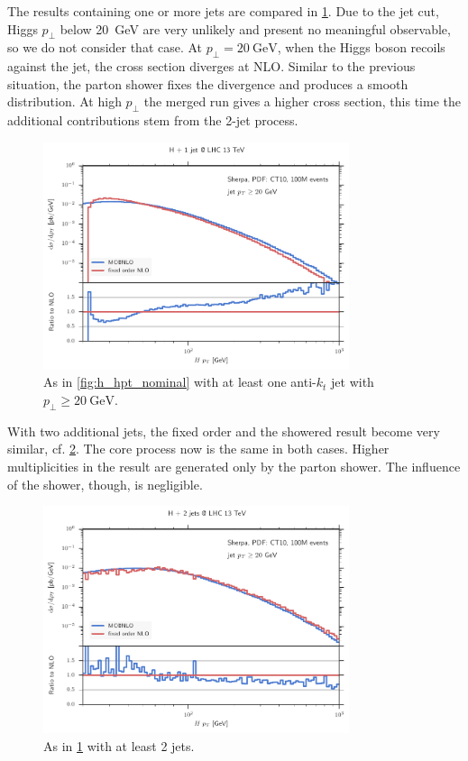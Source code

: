The results containing one or more jets are compared in \cref{fig:hj_hpt_nominal}.
Due to the jet cut, Higgs $p_\perp$ below \SI{20}{\giga\electronvolt} are very unlikely and present no meaningful observable, so we do not consider that case.
At $p_\perp = \SI{20}{\giga\electronvolt}$, when the Higgs boson recoils against the jet, the cross section diverges at NLO.
Similar to the previous situation, the parton shower fixes the divergence and produces a smooth distribution.
At high $p_\perp$ the merged run gives a higher cross section, this time the additional contributions stem from the 2-jet process.
%
\begin{figure}
	\centering
	\includegraphics[width=0.8\textwidth]{images/hj_hpt_nominal.pdf}
	\caption{As in \cref{fig:h_hpt_nominal} with at least one anti-$k_t$ jet with $p_\perp \geq \SI{20}{\giga\electronvolt}$.}
	\label{fig:hj_hpt_nominal}
\end{figure}
%

With two additional jets, the fixed order and the showered result become very similar, cf. \cref{fig:hjj_hpt_nominal}.
The core process now is the same in both cases.
Higher multiplicities in the \mcatnlo{} result are generated only by the parton shower.
The influence of the shower, though, is negligible.
%
\begin{figure}
	\centering
	\includegraphics[width=0.8\textwidth]{images/hjj_hpt_nominal.pdf}
	\caption{As in \cref{fig:hj_hpt_nominal} with at least 2 jets.}
	\label{fig:hjj_hpt_nominal}
\end{figure}
%
